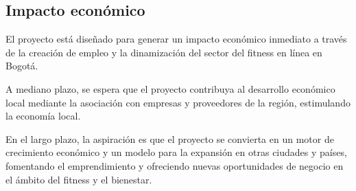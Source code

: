 \color{red}

\subsection{Impacto económico}

El proyecto está diseñado para generar un impacto económico inmediato a través de la creación de empleo y la dinamización del sector del fitness en línea en Bogotá.

A mediano plazo, se espera que el proyecto contribuya al desarrollo económico local mediante la asociación con empresas y proveedores de la región, estimulando la economía local.

En el largo plazo, la aspiración es que el proyecto se convierta en un motor de crecimiento económico y un modelo para la expansión en otras ciudades y países, fomentando el emprendimiento y ofreciendo nuevas oportunidades de negocio en el ámbito del fitness y el bienestar.